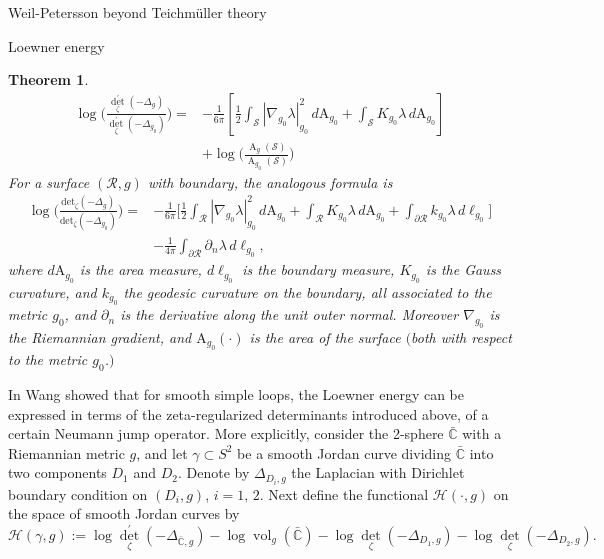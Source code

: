 \documentclass[12pt]{amsart}
\newcommand{\sphere}{\bar{\Bbb{C}}} %
\renewcommand{\Bbb}[1]{\ensuremath{\mathbb{#1}}}
\theoremstyle{plain}
\newtheorem{theorem}{Theorem}[section]
\theoremstyle{definition}
\theoremstyle{remark}
\numberwithin{equation}{section} %
\numberwithin{figure}{section} %
\begin{document}
\begin{section}{Weil-Petersson beyond Teichm\"uller theory}
\begin{subsection}{Loewner energy}
\begin{theorem}
\begin{equation}
\begin{aligned} \log \Big(\frac{\operatorname{det}_{\zeta}^{\prime}\left(-\Delta_{g}\right)}{ \operatorname{det}_{\zeta}^{\prime}\left(-\Delta_{g_0}\right)}\Big)=&-\frac{1}{6 \pi}\left[\frac{1}{2} \int_{\mathscr{S}}\left|\nabla_{g_0} \lambda\right|_{g_0}^{2}\, d\mathrm{A}_{g_0}+\int_{\mathscr{S}} K_{g_0} \lambda\, d\mathrm{A}_{g_0}\right] \\ &+\log\Big(\frac{ \operatorname{A}_{g}(\mathscr{S})}{\operatorname{A}_{g_0}(\mathscr{S})}\Big) 
\end{aligned}
\end{equation}
For a surface $(\mathscr{R},g)$ with boundary, the analogous formula is
\begin{equation}
\begin{aligned} 
\log \Big(\frac{\mathrm{det}_{\zeta}^{}\left(-\Delta_{g}\right)}{ \mathrm{det}_{\zeta}^{}\left(-\Delta_{g_0}\right)}\Big)=&-\frac{1}{6 \pi}\Big[\frac{1}{2} \int_{\mathscr{R}}\left|\nabla_{g_0} \lambda\right|_{g_0}^{2}\, d\mathrm{A}_{g_0}+\int_{\mathscr{R}} K_{g_0} \lambda\, d \mathrm{A}_{g_0}+\int_{\partial \mathscr{R}} k_{g_0} \lambda\, d \ell_{g_0}\Big]\\ & -\frac{1}{4 \pi} \int_{\partial \mathscr{R}} \partial_{n} \lambda\, d\ell_{g_0},
\end{aligned}
\end{equation}
where $d\mathrm{A}_{g_0}$ is the area measure, $d\ell_{g_0}$ is the boundary measure, $K_{g_0}$ is the Gauss curvature, and $k_{g_0}$ the geodesic curvature on the boundary, all associated to the metric $g_0$, and $\partial_{n}$ is the derivative along the unit outer normal. Moreover $\nabla_{g_0}$ is the Riemannian gradient, and $\mathrm{A}_{g_0}(\cdot)$ is the area of the surface $($both with respect to the metric $g_0$.$)$ 

\end{theorem}


In \cite{wangzeta} Wang  showed that for smooth simple loops, the Loewner energy can be
expressed in terms of the zeta-regularized determinants introduced above, of a certain Neumann jump operator. More explicitly, consider the 2-sphere  \(\sphere\) with a Riemannian metric $g$, and let \(\gamma \subset S^{2}\)
be a smooth Jordan curve dividing \(\sphere\) into two components \(D_{1}\) and \(D_{2}\). Denote
by \(\Delta_{D_{i}, g}\) the Laplacian with Dirichlet boundary condition on \(\left(D_{i}, g\right)\), $i=1,\,2$. Next define the functional \(\mathscr{H}(\cdot, g)\) on the space of smooth Jordan curves by
\begin{equation*}
\mathscr{H}(\gamma, g):=\log \operatorname{det}_{\zeta}^{\prime}\left(-\Delta_{\sphere, g}\right)-\log \operatorname{vol}_{g}\left(\sphere\right)  -\log \operatorname{det}_{\zeta}\left(-\Delta_{D_{1}, g}\right)-\log \operatorname{det}_{\zeta}\left(-\Delta_{D_{2}, g}\right).
\end{equation*}


\end{subsection}
\end{section}
\end{document}
